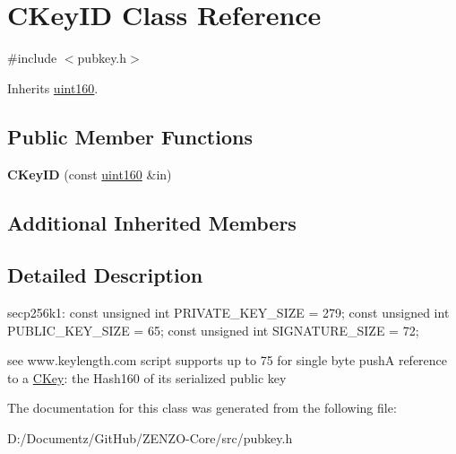 \hypertarget{class_c_key_i_d}{}\section{C\+Key\+ID Class Reference}
\label{class_c_key_i_d}


{\ttfamily \#include $<$pubkey.\+h$>$}



Inherits \mbox{\hyperlink{classuint160}{uint160}}.

\subsection*{Public Member Functions}
\begin{DoxyCompactItemize}
\item 
\mbox{\label{class_c_key_i_d_a695f373e11730318f9103100fa006a7e}} 
{\bfseries C\+Key\+ID} (const \mbox{\hyperlink{classuint160}{uint160}} \&in)
\end{DoxyCompactItemize}
\subsection*{Additional Inherited Members}


\subsection{Detailed Description}
secp256k1\+: const unsigned int P\+R\+I\+V\+A\+T\+E\+\_\+\+K\+E\+Y\+\_\+\+S\+I\+ZE = 279; const unsigned int P\+U\+B\+L\+I\+C\+\_\+\+K\+E\+Y\+\_\+\+S\+I\+ZE = 65; const unsigned int S\+I\+G\+N\+A\+T\+U\+R\+E\+\_\+\+S\+I\+ZE = 72;

see www.\+keylength.\+com script supports up to 75 for single byte pushA reference to a \mbox{\hyperlink{class_c_key}{C\+Key}}\+: the Hash160 of its serialized public key 

The documentation for this class was generated from the following file\+:\begin{DoxyCompactItemize}
\item 
D\+:/\+Documentz/\+Git\+Hub/\+Z\+E\+N\+Z\+O-\/\+Core/src/pubkey.\+h\end{DoxyCompactItemize}
